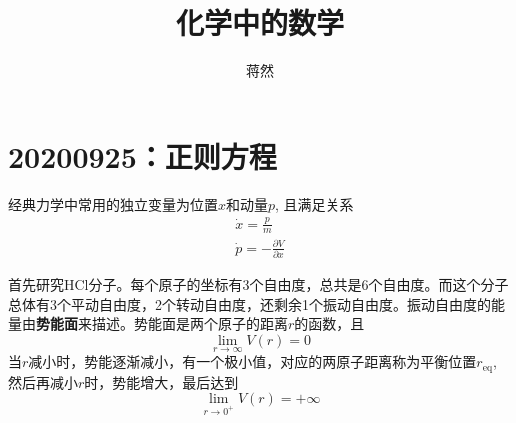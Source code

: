 \documentclass[12pt]{article}
\title{\heiti 化学中的数学}
\author{\kaishu 蒋然}
\begin{document}
\maketitle
\tableofcontents

\section{20200925：正则方程}

    经典力学中常用的独立变量为位置$x$和动量$p$, 且满足关系
    \begin{align*}
        \dot{x} = \frac pm\\
        \dot{p} = -\frac {\partial V}{\partial x}
    \end{align*}

    首先研究HCl分子。每个原子的坐标有3个自由度，总共是6个自由度。而这个分子总体有3个平动自由度，2个转动自由度，还剩余1个振动自由度。振动自由度的能量由\textbf{势能面}来描述。势能面是两个原子的距离$r$的函数，且
    \begin{equation*}
        \lim_{r \to \infty} V(r) = 0
    \end{equation*}
    当$r$减小时，势能逐渐减小，有一个极小值，对应的两原子距离称为平衡位置$r_\mathrm{eq}$, 然后再减小$r$时，势能增大，最后达到
    \begin{equation*}
        \lim_{r \to 0^+} V(r) = +\infty
    \end{equation*}
\end{document}
